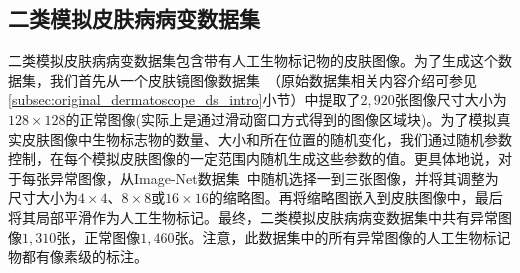 \subsection{二类模拟皮肤病病变数据集}\label{subsec:bin_simulated_skin_ds}
二类模拟皮肤病病变数据集包含带有人工生物标记物的皮肤图像。为了生成这个数据集，我们首先从一个皮肤镜图像数据集~\cite{codella2018skin}（原始数据集相关内容介绍可参见\ref{subsec:original_dermatoscope_ds_intro}小节）中提取了$2,920$张图像尺寸大小为$128\times128$的正常图像(实际上是通过滑动窗口方式得到的图像区域块)。为了模拟真实皮肤图像中生物标志物的数量、大小和所在位置的随机变化，我们通过随机参数控制，在每个模拟皮肤图像的一定范围内随机生成这些参数的值。更具体地说，对于每张异常图像，从Image-Net数据集~\cite{deng2009imagenet}中随机选择一到三张图像，并将其调整为尺寸大小为$4\times 4$、$8\times 8$或$16\times 16$的缩略图。再将缩略图嵌入到皮肤图像中，最后将其局部平滑作为人工生物标记。最终，二类模拟皮肤病病变数据集中共有异常图像$1,310$张，正常图像$1,460$张。注意，此数据集中的所有异常图像的人工生物标记物都有像素级的标注。

